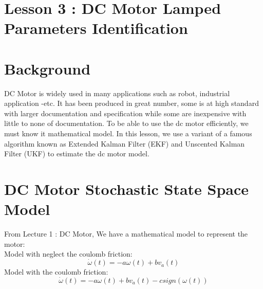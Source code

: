 \documentclass[12pt,a4paper]{article}
\begin{document}
	\section*{\centering Lesson 3 : DC Motor Lamped Parameters Identification}
	\section{Background}
	DC Motor is widely used in many applications such as robot, industrial application -etc. It has been produced in great number, some is at high standard with larger documentation and specification while some are inexpensive with little to none of documentation. To be able to use the dc motor efficiently, we must know it mathematical model. In this lesson, we use a variant of a famous algorithm known as Extended Kalman Filter (EKF) and Unscented Kalman Filter (UKF) to estimate the dc motor model.\par
	
	\section{DC Motor Stochastic State Space Model}
	From Lecture 1 : DC Motor, We have a mathematical model to represent the motor:\\
	Model with neglect the coulomb friction:
	\[\boxed{\dot{\omega}(t) = - a\omega(t) + bv_a(t)}\]
	Model with the coulomb friction:
	\[\boxed{\dot{\omega}(t) = - a\omega(t) + bv_a(t) - csign(\omega(t))}\]
	
\end{document}
